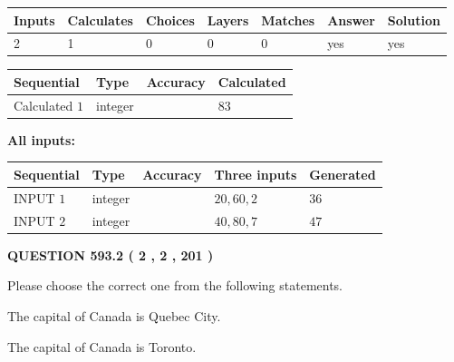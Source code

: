 \documentclass[12pt]{article}
\begin{document}
   
   
   
\noindent\begin{tabular}{|l|l|l|l|l|l|l|}
 \hline
Inputs & Calculates & Choices & Layers & Matches & Answer & Solution \\ \hline
 2  & 
 1  & 
 0
  & 
 0  & 
 0  & 
  yes & 
  yes 
  \\ \hline
 \end{tabular}
   
   
   
   
\noindent{}
   
   
  
  
\noindent\begin{tabular}{|l|l|l|l|}
\hline
 Sequential & Type & Accuracy & Calculated \\ 
\hline
 
 
  Calculated $  1 $ & integer &  & 
  $ 83 $ 
 \\  \hline  
 \end{tabular}
   
   
   
   
\noindent\vspace{0.1in}\hspace{-0.08in} {\textbf{\Large{All inputs: }}}
   
   
  
  
\noindent\begin{tabular}{|l|l|l|l|l|}
\hline
 Sequential & Type & Accuracy & Three inputs & Generated \\ 
\hline
 
 
  INPUT $  1 $ & integer &  & $
 20
 , 
 60
 , 
 2
 $ & $ 36 $ 
 \\  \hline  
 
 
  INPUT $  2 $ & integer &  & $
 40
 , 
 80
 , 
 7
 $ & $ 47 $ 
 \\  \hline  
 \end{tabular}
   
   
  
\vspace{0.2in}
  
{\textbf{\Large{QUESTION
593.2 
 ( 2 , 2 , 201 )
}}}
  
  
Please choose the correct one from the following statements.
 
 
The capital of Canada is Quebec City.
 
 
The capital of Canada is Toronto.
 
\end{document}
